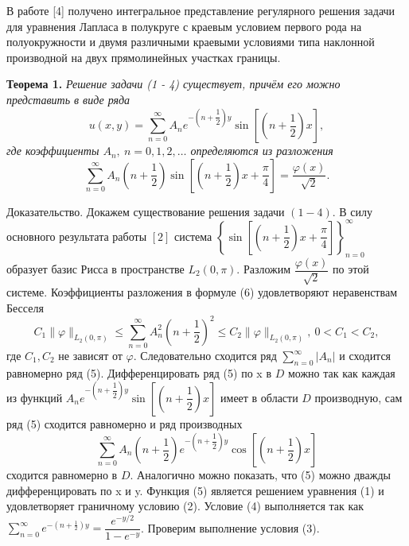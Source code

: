 \documentclass[a4paper, 9pt]{article}
\begin{document}
	В работе [4] получено интегральное представление регулярного решения задачи для уравнения Лапласа
	в полукруге с краевым условием первого рода на полуокружности и двумя различными
	краевыми условиями типа наклонной производной на двух прямолинейных участках границы.
	\par
	\textbf{Теорема 1.} \textit{Решение задачи (1 - 4) существует, причём его можно представить в виде ряда}
		\begin{equation}
			u(x,y) = \sum\limits_{n=0}^{\infty} A_n e^{-\left(n + \dfrac12\right)y} \sin{\left[\left(n + \dfrac12\right)x\right]},
		\end{equation}
		\textit{где коэффициенты $A_n, \ n =0,1,2, \dots$ определяются из разложения}
		\begin{equation}
			\sum\limits_{n=0}^{\infty} A_n \left(n + \dfrac12 \right) \sin{\left[\left(n +\dfrac12\right)x + \dfrac\pi4\right]} = \dfrac{\varphi(x)}{\sqrt2}.
		\end{equation}
	
	\par
	Доказательство. Докажем существование решения задачи $(1 - 4)$. В силу основного результата работы $[2]$ система  $\left\{\sin{\left[\left(n + \dfrac12\right)x + \dfrac\pi4\right]}\right\}_{n=0}^{\infty}$ образует базис Рисса в пространстве $L_2(0, \pi)$. Разложим $\dfrac{\varphi(x)}{\sqrt2}$ по этой системе. Коэффициенты разложения в формуле (6) удовлетворяют неравенствам Бесселя
	\begin{equation*}
		C_1 \|\varphi \|_{L_2(0,\pi)} \leq \sum\limits_{n=0}^{\infty} A_n^2 \left(n + \dfrac12\right)^2 \leq C_2 \|\varphi \|_{L_2(0,\pi)} ,\ 0 < C_1 < C_2, 
	\end{equation*}
	где $C_1, C_2$ не зависят от $\varphi$. Следовательно сходится ряд $\sum\limits_{n=0}^{\infty} |A_n|$ и сходится равномерно ряд (5). Дифференцировать ряд (5) по x в $D$ можно так как каждая из функций $A_n e^{-\left(n + \dfrac12\right)y} \sin{\left[\left(n + \dfrac12\right)x\right]}$ имеет в области $D$ производную, сам ряд (5) сходится равномерно и ряд производных 
	\begin{equation*}
		\sum\limits_{n=0}^{\infty} A_n \left(n+\dfrac12\right)e^{-\left(n + \dfrac12\right)y} \cos{\left[\left(n + \dfrac12\right)x\right]}
	\end{equation*}
	 сходится равномерно в $D$. Аналогично можно показать, что (5) можно дважды дифференцировать по x и y. Функция (5) является решением уравнения (1) и удовлетворяет граничному условию (2). Условие (4) выполняется так как  $\sum\limits_{n=0}^{\infty} e^{-\left(n + \frac12\right)y} = \dfrac{e^{-y/2}}{1 - e^{-y}}$. Проверим выполнение условия (3).\newline
	 
\end{document}
